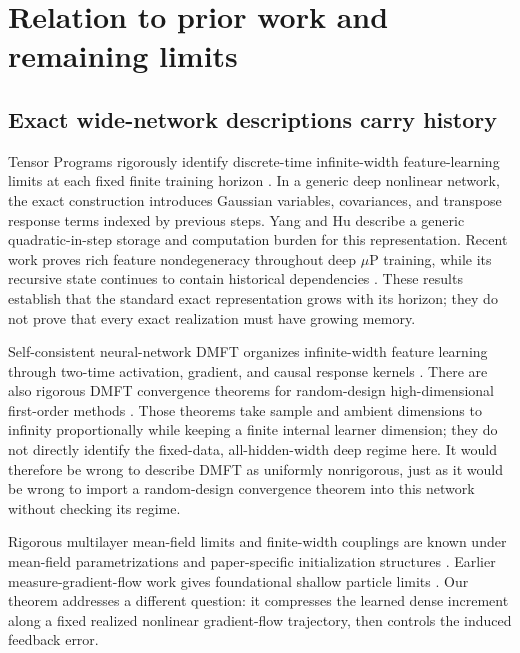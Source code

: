 \section{Relation to prior work and remaining limits}
\label{sec:context}

\subsection{Exact wide-network descriptions carry history}

Tensor Programs rigorously identify discrete-time infinite-width
feature-learning limits at each fixed finite training horizon
\citep{yang2021tensor}.  In a generic deep nonlinear network, the exact
construction introduces Gaussian variables, covariances, and transpose
response terms indexed by previous steps.  Yang and Hu describe a generic
quadratic-in-step storage and computation burden for this representation.
Recent work proves rich feature nondegeneracy throughout deep $\mu$P training,
while its recursive state continues to contain historical dependencies
\citep{chen2025global}.  These results establish that the standard exact
representation grows with its horizon; they do not prove that every exact
realization must have growing memory.

Self-consistent neural-network DMFT organizes infinite-width feature learning
through two-time activation, gradient, and causal response kernels
\citep{bordelon2022selfconsistent}.  There are also rigorous DMFT convergence
theorems for random-design high-dimensional first-order methods
\citep{celentano2026highdimensional,gerbelot2024rigorous}.  Those theorems take
sample and ambient dimensions to infinity proportionally while keeping a
finite internal learner dimension; they do not directly identify the
fixed-data, all-hidden-width deep regime here.  It would therefore be wrong to
describe DMFT as uniformly nonrigorous, just as it would be wrong to import a
random-design convergence theorem into this network without checking its
regime.

Rigorous multilayer mean-field limits and finite-width couplings are known
under mean-field parametrizations and paper-specific initialization structures
\citep{nguyen2023rigorous,araujo2019meanfield}.  Earlier measure-gradient-flow
work gives foundational shallow particle limits \citep{chizat2018global,
sirignano2020meanfield}.  Our theorem addresses a different question: it
compresses the learned dense increment along a fixed realized nonlinear
gradient-flow trajectory, then controls the induced feedback error.

